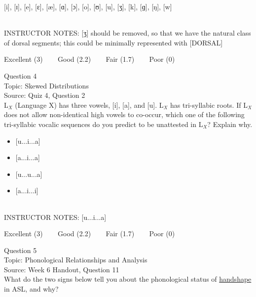 \documentclass[12pt]{article}
\begin{document}
{[i]}, {[ɪ]}, {[e]}, {[ɛ]}, {[æ]}, {[ɑ]}, {[ɔ]}, {[o]}, {[ʊ]}, {[u]}, {[ʒ]}, {[k]}, {[ɡ]}, {[ŋ]}, {[w]}


~\\
INSTRUCTOR NOTES: [ʒ] should be removed, so that we have the natural class of dorsal segments; this could be minimally represented with [DORSAL]


\vfill
Excellent (3) ~~~ Good (2.2) ~~~ Fair (1.7) ~~~ Poor (0)
\newpage

{\large Question 4}\\

Topic: Skewed Distributions\\
Source: Quiz 4, Question 2\\

L$_X$ (Language X) has three vowels, [i], [a], and [u]. L$_X$ has tri-syllabic roots. If L$_X$ does not allow non-identical high vowels to co-occur, which one of the following tri-syllabic vocalic sequences do you predict to be unattested in L$_X$? Explain why.\\

\begin{itemize} \item {[u...i...a]} \item {[a...i...a]} \item {[u...u...a]} \item {[a...i...i]} \end{itemize}


~\\
INSTRUCTOR NOTES: [u...i...a]


\vfill
Excellent (3) ~~~ Good (2.2) ~~~ Fair (1.7) ~~~ Poor (0)
\newpage

{\large Question 5}\\

Topic: Phonological Relationships and Analysis\\
Source: Week 6 Handout, Question 11\\

What do the two signs below tell you about the phonological status of \underline{handshape} in ASL, and why?\\
\end{document}
